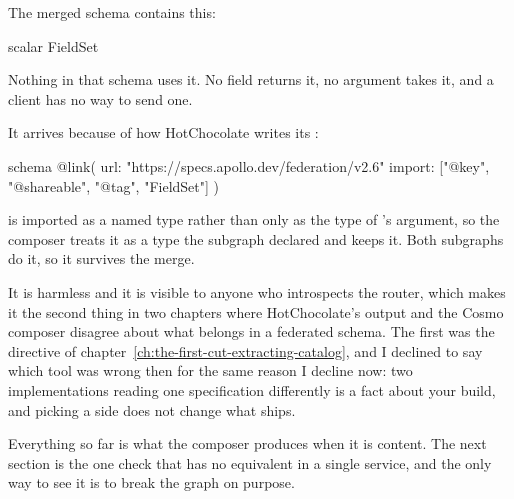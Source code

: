 %
The merged schema contains this:

\begin{graphqlsdl}
scalar FieldSet
\end{graphqlsdl}

Nothing in that schema uses it. No field returns it, no argument takes it, and a
client has no way to send one.

It arrives because of how HotChocolate writes its :

\begin{graphqlsdl}
schema
  @link(
    url: "https://specs.apollo.dev/federation/v2.6"
    import: ["@key", "@shareable", "@tag", "FieldSet"]
  )
\end{graphqlsdl}

 is imported as a named type rather than only as the type of
's argument, so the composer treats it as a type the subgraph
declared and keeps it. Both subgraphs do it, so it survives the merge.

It is harmless and it is visible to anyone who introspects the router, which
makes it the second thing in two chapters where HotChocolate's output and the
Cosmo composer disagree about what belongs in a federated schema. The first was
the  directive of
chapter~\ref{ch:the-first-cut-extracting-catalog}, and I declined to say which
tool was wrong then for the same reason I decline now: two implementations
reading one specification differently is a fact about your build, and picking a
side does not change what ships.

Everything so far is what the composer produces when it is content. The next
section is the one check that has no equivalent in a single service, and the
only way to see it is to break the graph on purpose.

%
